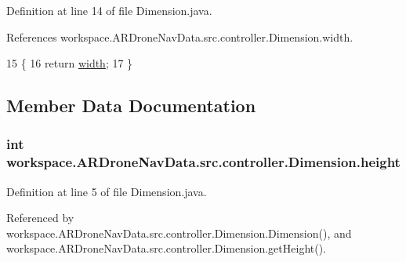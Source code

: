 Definition at line 14 of file Dimension.\+java.



References workspace.\+A\+R\+Drone\+Nav\+Data.\+src.\+controller.\+Dimension.\+width.


\begin{DoxyCode}
15     \{
16         \textcolor{keywordflow}{return} \hyperlink{classworkspace_1_1_a_r_drone_nav_data_1_1src_1_1controller_1_1_dimension_ab9ac1821926d7b93ed9601e81e5fdd79}{width};
17     \}
\end{DoxyCode}


\subsection{Member Data Documentation}
\hypertarget{classworkspace_1_1_a_r_drone_nav_data_1_1src_1_1controller_1_1_dimension_ae9213b87835a35e1f34faecf223ad85f}{}
\subsubsection[{height}]{\setlength{\rightskip}{0pt plus 5cm}int workspace.\+A\+R\+Drone\+Nav\+Data.\+src.\+controller.\+Dimension.\+height\hspace{0.3cm}{\ttfamily [private]}}\label{classworkspace_1_1_a_r_drone_nav_data_1_1src_1_1controller_1_1_dimension_ae9213b87835a35e1f34faecf223ad85f}


Definition at line 5 of file Dimension.\+java.



Referenced by workspace.\+A\+R\+Drone\+Nav\+Data.\+src.\+controller.\+Dimension.\+Dimension(), and workspace.\+A\+R\+Drone\+Nav\+Data.\+src.\+controller.\+Dimension.\+get\+Height().

\hypertarget{classworkspace_1_1_a_r_drone_nav_data_1_1src_1_1controller_1_1_dimension_ab9ac1821926d7b93ed9601e81e5fdd79}{}
